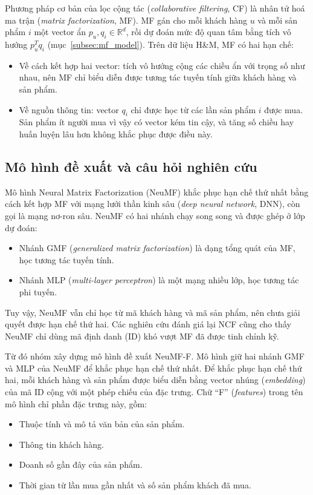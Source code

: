 Phương pháp cơ bản của lọc cộng tác (\textit{collaborative filtering}, CF) là nhân tử hoá ma trận (\textit{matrix factorization}, MF). MF gán cho mỗi khách hàng $u$ và mỗi sản phẩm $i$ một vector ẩn $p_u, q_i \in \mathbb{R}^d$, rồi dự đoán mức độ quan tâm bằng tích vô hướng $p_u^T q_i$ (mục~\ref{subsec:mf_model}). Trên dữ liệu H\&M, MF có hai hạn chế:
\begin{itemize}
    \item Về cách kết hợp hai vector: tích vô hướng cộng các chiều ẩn với trọng số như nhau, nên MF chỉ biểu diễn được tương tác tuyến tính giữa khách hàng và sản phẩm.
    \item Về nguồn thông tin: vector $q_i$ chỉ được học từ các lần sản phẩm $i$ được mua. Sản phẩm ít người mua vì vậy có vector kém tin cậy, và tăng số chiều hay huấn luyện lâu hơn không khắc phục được điều này.
\end{itemize}

\subsection{Mô hình đề xuất và câu hỏi nghiên cứu}
\label{subsec:sumenh_neumf}

Mô hình Neural Matrix Factorization (NeuMF) khắc phục hạn chế thứ nhất bằng cách kết hợp MF với mạng lưới thần kinh sâu (\textit{deep neural network}, DNN), còn gọi là mạng nơ-ron sâu. NeuMF có hai nhánh chạy song song và được ghép ở lớp dự đoán:
\begin{itemize}
    \item Nhánh GMF (\textit{generalized matrix factorization}) là dạng tổng quát của MF, học tương tác tuyến tính.
    \item Nhánh MLP (\textit{multi-layer perceptron}) là một mạng nhiều lớp, học tương tác phi tuyến.
\end{itemize}

Tuy vậy, NeuMF vẫn chỉ học từ mã khách hàng và mã sản phẩm, nên chưa giải quyết được hạn chế thứ hai. Các nghiên cứu đánh giá lại NCF cũng cho thấy NeuMF chỉ dùng mã định danh (ID) khó vượt MF đã được tinh chỉnh kỹ.

Từ đó nhóm xây dựng mô hình đề xuất NeuMF-F. Mô hình giữ hai nhánh GMF và MLP của NeuMF để khắc phục hạn chế thứ nhất. Để khắc phục hạn chế thứ hai, mỗi khách hàng và sản phẩm được biểu diễn bằng vector nhúng (\textit{embedding}) của mã ID cộng với một phép chiếu của đặc trưng. Chữ ``F'' (\textit{features}) trong tên mô hình chỉ phần đặc trưng này, gồm:
\begin{itemize}
    \item Thuộc tính và mô tả văn bản của sản phẩm.
    \item Thông tin khách hàng.
    \item Doanh số gần đây của sản phẩm.
    \item Thời gian từ lần mua gần nhất và số sản phẩm khách đã mua.
\end{itemize}

